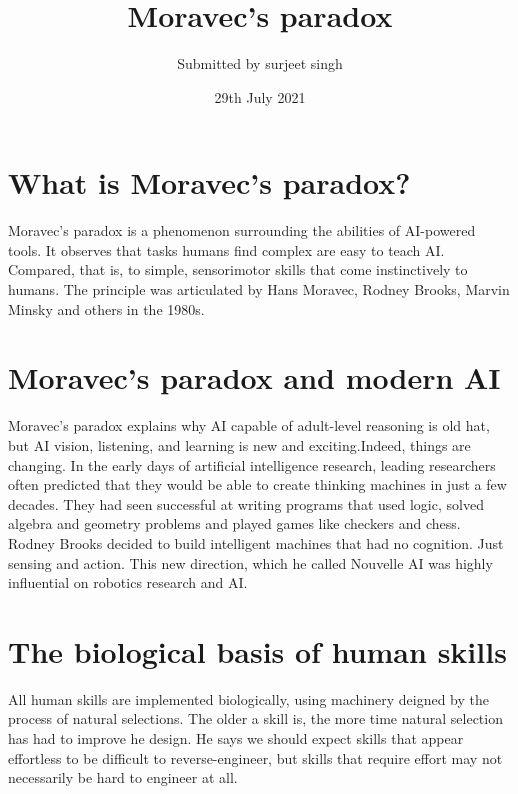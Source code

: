 \documentclass{article}
\title{Moravec’s paradox}
\author{Submitted by surjeet singh}
\date{29th July 2021}
\begin{document}
\maketitle

\section{What is Moravec’s paradox?}

Moravec’s paradox is a phenomenon surrounding the abilities of AI-powered tools. It observes that tasks humans find complex are easy to teach AI. Compared, that is, to simple, sensorimotor skills that come instinctively to humans. The principle was articulated by Hans Moravec, Rodney Brooks, Marvin Minsky and others in the 1980s. 

\section{Moravec’s paradox and modern AI}
Moravec’s paradox explains why AI capable of adult-level reasoning is old hat, but AI vision, listening, and learning is new and exciting.Indeed, things are changing.
In the early days of artificial intelligence research, leading researchers often predicted that they would be able to create thinking machines in just a few decades. They had seen successful at writing programs that used logic, solved algebra and geometry problems and played games like checkers and chess. Rodney Brooks decided to build intelligent machines that had no cognition. Just sensing and action. This new direction, which he called Nouvelle AI was highly influential on robotics research and AI.
\section{The biological basis of human skills}

All human skills are implemented biologically, using machinery deigned by the process of natural selections. The older a skill is, the more time natural selection has had to improve he design. He says we should expect skills that appear effortless to be difficult to reverse-engineer, but skills that require effort may not necessarily be hard to engineer at all.
\end{document}
